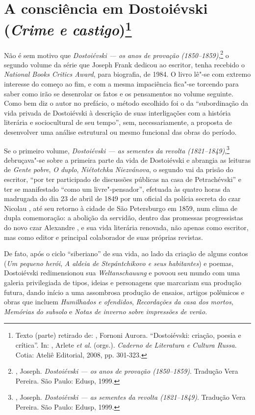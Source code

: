 \chapter{A consciência em Dostoiévski (\emph{Crime e castigo})\footnote{Texto (parte) retirado de: {}, Fornoni Aurora. ``Dostoiévski: criação, poesia e crítica''. In: {}, Arlete \emph{et al}. (orgs.). \emph{Caderno de Literatura e Cultura Russa}. Cotia: Ateliê Editorial, 2008, pp. 301-323.}}

Não é sem motivo que \emph{Dostoiévski --- os anos de provação (1850--1859)},\footnote{, Joseph. \emph{Dostoiévski --- os anos de provação (1850--1859)}. Tradução Vera Pereira. São Paulo: Edusp, 1999.} o segundo volume da série que Joseph Frank dedicou ao escritor, tenha recebido o \emph{National Books Critics Award}, para biografia, de 1984. O livro lê"-se com extremo interesse do começo ao fim, e com a mesma impaciência fica"-se torcendo para saber como irão se desenrolar os fatos e os pensamentos no volume seguinte. Como bem diz o autor no prefácio, o método escolhido foi o da ``subordinação da vida privada de Dostoiévski à descrição de suas interligações com a história literária e sociocultural de seu tempo'', sem, necessariamente, a proposta de desenvolver uma análise estrutural ou mesmo funcional das obras do período.

Se o primeiro volume, \emph{Dostoiévski --- as sementes da revolta
(1821--1849)},\footnote{, Joseph. \emph{Dostoiévski --- as sementes
da revolta (1821--1849)}. Tradução Vera Pereira. São Paulo: Edusp,
  1999.} debruçava"-se sobre a primeira parte da vida de Dostoiévski e
abrangia as leituras de \emph{Gente pobre}, \emph{O duplo},
\emph{Niétotchka Niezvánova}, o segundo vai da prisão do escritor, ``por
ter participado de discussões públicas na casa de Petrachévski'' e ter
se manifestado ``como um livre"-pensador'', efetuada às quatro horas da
madrugada do dia 23 de abril de 1849 por um oficial da polícia secreta
do czar Nicolau , até seu retorno à cidade de São Petersburgo em 1859,
num clima de dupla comemoração: a abolição da servidão, dentro das
promessas progressistas do novo czar Alexandre , e sua vida literária
renovada, não apenas como escritor, mas como editor e principal
colaborador de suas próprias revistas.

De fato, após o ciclo ``siberiano'' de sua vida, ao lado da criação de
alguns contos (\emph{Um pequeno herói}, \emph{A aldeia de Stepántchikovo
e seus habitantes}) e poemas, Dostoiévski redimensionou sua
\emph{Weltanschauung} e povoou seu mundo com uma galeria privilegiada de
tipos, ideias e personagens que marcariam sua produção futura, dando
início a uma assombrosa produção de ensaios, artigos polêmicos e obras
que incluem \emph{Humilhados e ofendidos}, \emph{Recordações da casa dos
mortos}, \emph{Memórias do subsolo} e \emph{Notas de inverno sobre
impressões de verão}.

